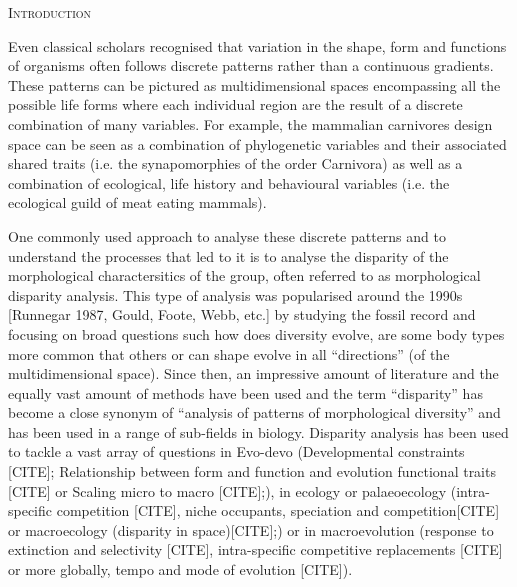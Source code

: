 \documentclass[12pt,letterpaper]{article}
\renewcommand{\section}[1]{%
\bigskip
\begin{center}
\begin{Large}
\normalfont\scshape #1
\medskip
\end{Large}
\end{center}}
\begin{document}
\vspace{1.5in}

\newpage 

%
%


\section{Introduction}

Even classical scholars recognised that variation in the shape, form and functions of organisms often follows discrete patterns rather than a continuous gradients.
These patterns can be pictured as multidimensional spaces encompassing all the possible life forms where each individual region are the result of a discrete combination of many variables.
For example, the mammalian carnivores design space can be seen as a combination of phylogenetic variables and their associated shared traits (i.e. the synapomorphies of the order Carnivora) as well as a combination of ecological, life history and behavioural variables (i.e. the ecological guild of meat eating mammals).

One commonly used approach to analyse these discrete patterns and to understand the processes that led to it is to analyse the disparity of the morphological charactersitics of the group, often referred to as morphological disparity analysis.
This type of analysis was popularised around the 1990s [Runnegar 1987, Gould, Foote, Webb, etc.] by studying the fossil record and focusing on broad questions such how does diversity evolve, are some body types more common that others or can shape evolve in all ``directions'' (of the multidimensional space).
Since then, an impressive amount of literature and the equally vast amount of methods have been used and the term ``disparity'' has become a close synonym of ``analysis of patterns of morphological diversity'' and has been used in a range of sub-fields in biology.
Disparity analysis has been used to tackle a vast array of questions in Evo-devo (Developmental constraints [CITE]; Relationship between form and function and evolution functional traits [CITE] or Scaling micro to macro [CITE];), in ecology or palaeoecology (intra-specific competition [CITE], niche occupants, speciation and competition[CITE] or macroecology (disparity in space)[CITE];)
or in macroevolution (response to extinction and selectivity [CITE], intra-specific competitive replacements [CITE] or more globally, tempo and mode of evolution [CITE]).
\end{document}
